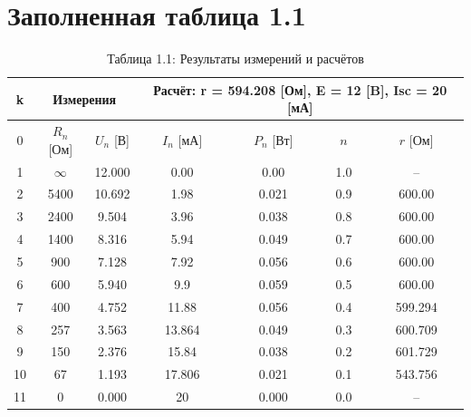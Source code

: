 \documentclass[a4paper]{article}
\begin{document}
\section{Заполненная таблица 1.1}
\begin{table}[H]
	\centering
	\addtocounter{table}{0}
	\caption*{Таблица 1.1: Результаты измерений и расчётов}
	\begin{tabular}{|c|c|c|c|c|c|c|}
		\hline
		k  & \multicolumn{2}{c|}{Измерения} & \multicolumn{4}{c|}{Расчёт: r = 594.208 [Ом], E = 12 [B], Isc = 20 [мА]}                                            \\
		\hline
		0  & $R_n$ [Ом]                     & $U_n$ [В]                                                                & $I_n$ [мА] & $P_n$ [Вт] & $n$ & $r$ [Ом] \\
		\hline
		1  & $\infty$                       & 12.000                                                                   & 0.00       & 0.00       & 1.0 & --       \\
		2  & 5400                           & 10.692                                                                   & 1.98       & 0.021      & 0.9 & 600.00   \\
		3  & 2400                           & 9.504                                                                    & 3.96       & 0.038      & 0.8 & 600.00   \\
		4  & 1400                           & 8.316                                                                    & 5.94       & 0.049      & 0.7 & 600.00   \\
		5  & 900                            & 7.128                                                                    & 7.92       & 0.056      & 0.6 & 600.00   \\
		6  & 600                            & 5.940                                                                    & 9.9        & 0.059      & 0.5 & 600.00   \\
		7  & 400                            & 4.752                                                                    & 11.88      & 0.056      & 0.4 & 599.294  \\
		8  & 257                            & 3.563                                                                    & 13.864     & 0.049      & 0.3 & 600.709  \\
		9  & 150                            & 2.376                                                                    & 15.84      & 0.038      & 0.2 & 601.729  \\
		10 & 67                             & 1.193                                                                    & 17.806     & 0.021      & 0.1 & 543.756  \\
		11 & 0                              & 0.000                                                                    & 20         & 0.000      & 0.0 & --       \\
		\hline
	\end{tabular}
\end{table}
\end{document}
